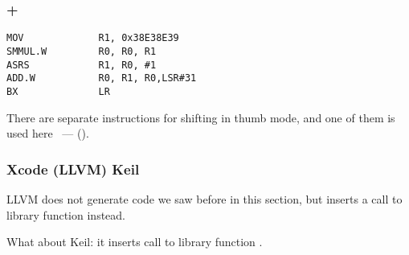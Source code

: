 \subsubsection{\OptimizingXcode + \ThumbTwoMode}

\begin{lstlisting}
MOV             R1, 0x38E38E39
SMMUL.W         R0, R0, R1
ASRS            R1, R0, #1
ADD.W           R0, R1, R0,LSR#31
BX              LR
\end{lstlisting}

{There are separate instructions for shifting in thumb mode}, 
{and one of them is used here} ~---  ().

\subsubsection{\NonOptimizing Xcode (LLVM) \AndENRU Keil}

\NonOptimizing LLVM 
{does not generate code we saw before in this section, but inserts a call to library function 
 instead}.

{What about Keil: it inserts call to library function} .

